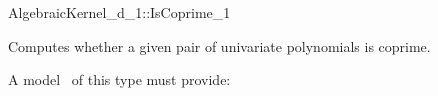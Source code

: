 \begin{ccRefConcept}{AlgebraicKernel_d_1::IsCoprime_1}

\ccDefinition
Computes whether a given pair of univariate polynomials is coprime. 
 
\ccRefines 
{} 

\ccOperations
{}

A model \ccVar\ of this type must provide:

{}

\end{ccRefConcept}
